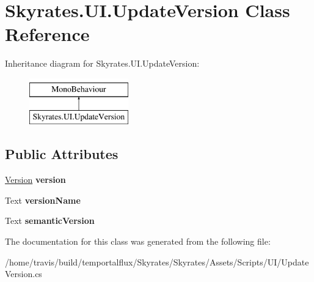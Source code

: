 \hypertarget{class_skyrates_1_1_u_i_1_1_update_version}{\section{Skyrates.\-U\-I.\-Update\-Version Class Reference}
\label{class_skyrates_1_1_u_i_1_1_update_version}
}
Inheritance diagram for Skyrates.\-U\-I.\-Update\-Version\-:\begin{figure}[H]
\begin{center}
\leavevmode
\includegraphics[height=2.000000cm]{class_skyrates_1_1_u_i_1_1_update_version}
\end{center}
\end{figure}
\subsection*{Public Attributes}
\begin{DoxyCompactItemize}
\item 
\hypertarget{class_skyrates_1_1_u_i_1_1_update_version_a050dd874e2dcd2a88325def92edda126}{\hyperlink{class_version}{Version} {\bfseries version}}\label{class_skyrates_1_1_u_i_1_1_update_version_a050dd874e2dcd2a88325def92edda126}

\item 
\hypertarget{class_skyrates_1_1_u_i_1_1_update_version_ad8f9d6d4d87c87761eab473620ee7c5f}{Text {\bfseries version\-Name}}\label{class_skyrates_1_1_u_i_1_1_update_version_ad8f9d6d4d87c87761eab473620ee7c5f}

\item 
\hypertarget{class_skyrates_1_1_u_i_1_1_update_version_a7191470020025b250c71b0b724421699}{Text {\bfseries semantic\-Version}}\label{class_skyrates_1_1_u_i_1_1_update_version_a7191470020025b250c71b0b724421699}

\end{DoxyCompactItemize}


The documentation for this class was generated from the following file\-:\begin{DoxyCompactItemize}
\item 
/home/travis/build/temportalflux/\-Skyrates/\-Skyrates/\-Assets/\-Scripts/\-U\-I/Update\-Version.\-cs\end{DoxyCompactItemize}
